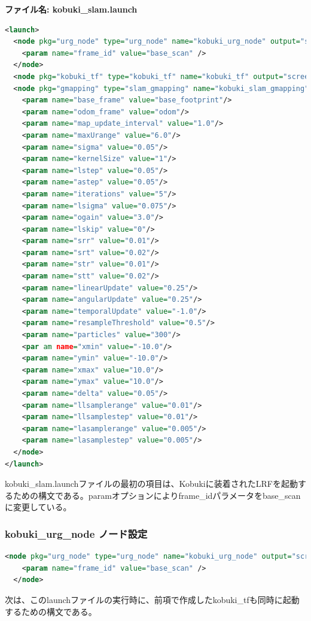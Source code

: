 \textbf{ファイル名: kobuki\_slam.launch}
\begin{lstlisting}[language=XML]
<launch>
  <node pkg="urg_node" type="urg_node" name="kobuki_urg_node" output="screen">
    <param name="frame_id" value="base_scan" />
  </node>
  <node pkg="kobuki_tf" type="kobuki_tf" name="kobuki_tf" output="screen"></node>
  <node pkg="gmapping" type="slam_gmapping" name="kobuki_slam_gmapping" output="screen">
    <param name="base_frame" value="base_footprint"/>
    <param name="odom_frame" value="odom"/>
    <param name="map_update_interval" value="1.0"/>
    <param name="maxUrange" value="6.0"/>
    <param name="sigma" value="0.05"/>
    <param name="kernelSize" value="1"/>
    <param name="lstep" value="0.05"/>
    <param name="astep" value="0.05"/>
    <param name="iterations" value="5"/>
    <param name="lsigma" value="0.075"/>
    <param name="ogain" value="3.0"/>
    <param name="lskip" value="0"/>
    <param name="srr" value="0.01"/>
    <param name="srt" value="0.02"/>
    <param name="str" value="0.01"/>
    <param name="stt" value="0.02"/>
    <param name="linearUpdate" value="0.25"/>
    <param name="angularUpdate" value="0.25"/>
    <param name="temporalUpdate" value="-1.0"/>
    <param name="resampleThreshold" value="0.5"/>
    <param name="particles" value="300"/>
    <par am name="xmin" value="-10.0"/>
    <param name="ymin" value="-10.0"/>
    <param name="xmax" value="10.0"/>
    <param name="ymax" value="10.0"/>
    <param name="delta" value="0.05"/>
    <param name="llsamplerange" value="0.01"/>
    <param name="llsamplestep" value="0.01"/>
    <param name="lasamplerange" value="0.005"/>
    <param name="lasamplestep" value="0.005"/>
  </node>
</launch>
\end{lstlisting}

kobuki\_slam.launchファイルの最初の項目は、Kobukiに装着されたLRFを起動するための構文である。paramオプションによりframe\_idパラメータをbase\_scanに変更している。

\subsubsection{kobuki\_urg\_node ノード設定}

\begin{lstlisting}[language=XML]
  <node pkg="urg_node" type="urg_node" name="kobuki_urg_node" output="screen">
    <param name="frame_id" value="base_scan" />
  </node>
\end{lstlisting}

次は、このlaunchファイルの実行時に、前項で作成したkobuki\_tfも同時に起動するための構文である。

